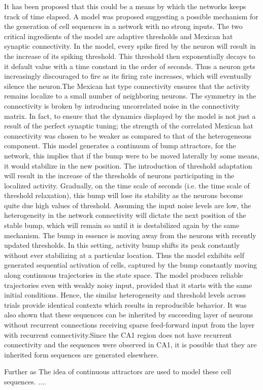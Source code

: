It has been proposed that this could be a means by which the networks keeps track of time elapsed. A model was proposed suggesting a possible mechanism for the generation of cell sequences in a network with no strong inputs.  The two critical ingredients of the model are adaptive thresholds and Mexican hat synaptic connectivity. In the model, every spike fired by the neuron will result in the increase of its spiking threshold. This threshold then exponentially decays to it default value with a time constant in the order of seconds. Thus a neuron gets increasingly discouraged to fire as its firing rate increases, which will eventually silence the neuron.The Mexican hat type connectivity ensures that the activity remains localize to a small number of neighboring neurons. The symmetry in the connectivity is broken by introducing uncorrelated noise in the connectivity matrix. In fact, to ensure that the dynamics displayed by the model is not just a result of the perfect synaptic tuning; the strength of the correlated Mexican hat connectivity was chosen to be weaker as compared to that of the heterogeneous component. This model generates a continuum of bump attractors, for the network, this implies that if the bump were to be moved laterally by some means, it would stabilize in the new position.  The introduction of threshold adaptation will result in the increase of the thresholds of neurons participating in the localized activity. Gradually, on the time scale of seconds (i.e. the time scale of threshold relaxation), this bump will lose its stability as the neurons become quite due high values of threshold. Assuming the input noise levels are low, the heterogeneity in the network connectivity will dictate the next position of the stable bump, which will remain so until it is destabilized again by the same mechanism. The bump in essence is moving away from the neurons with recently updated thresholds. In this setting, activity bump shifts its peak constantly without ever stabilizing at a particular location. Thus the model exhibits self generated sequential activation of cells, captured by the bump constantly moving along continuous trajectories in the state space. The model produces reliable trajectories even with weakly noisy input, provided that it starts with the same initial conditions. Hence, the similar heterogeneity and threshold levels across trials provide identical contexts which results in reproducible behavior. It was also shown that these sequences can be inherited by succeeding layer of neurons without recurrent connections receiving sparse feed-forward input from the layer with recurrent connectivity.Since the CA1 region does not have recurrent connectivity and the sequences were observed in CA1, it is possible that they are inherited form sequences are generated elsewhere.


Further as 
The idea of continuous attractors are used to model these cell sequences.   ....


